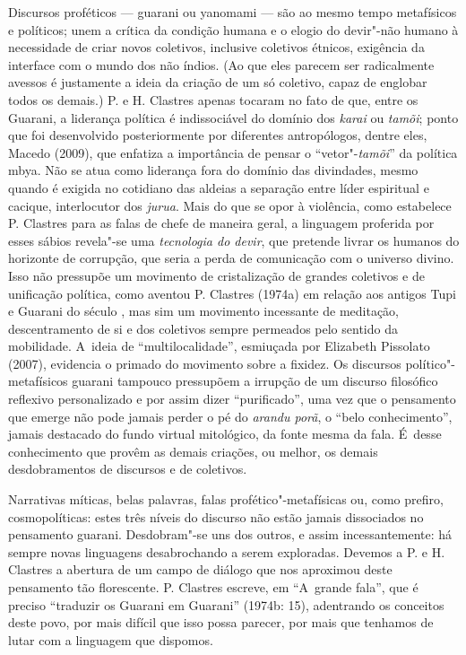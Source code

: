 Discursos proféticos --- guarani ou yanomami --- são ao mesmo tempo
metafísicos e políticos; unem a crítica da condição humana e o elogio
do devir"-não humano à necessidade de criar novos coletivos, inclusive
coletivos étnicos, exigência da interface com o mundo dos não índios.
(Ao que eles parecem ser radicalmente avessos é justamente a ideia da
criação de um só coletivo, capaz de englobar todos os demais.) P. e H.
Clastres apenas tocaram no fato de que, entre os Guarani, a liderança
política é indissociável do domínio dos \emph{karai} ou \emph{tamõi}; ponto que foi
desenvolvido posteriormente por diferentes antropólogos, dentre eles,
Macedo (2009), que enfatiza a importância de pensar o ``vetor"-\emph{tamõi}'' da
política mbya. Não se atua como liderança fora do domínio das
divindades, mesmo quando é exigida no cotidiano das aldeias a separação
entre líder espiritual e cacique, interlocutor dos \emph{jurua}. Mais do que
se opor à violência, como estabelece P. Clastres para as falas de chefe
de maneira geral, a linguagem proferida por esses sábios revela"-se uma
\emph{tecnologia do devir}, que pretende livrar os humanos do horizonte de
corrupção, que seria a perda de comunicação com o universo divino. Isso
não pressupõe um movimento de cristalização de grandes coletivos e de
unificação política, como aventou P. Clastres (1974a) em relação aos
antigos Tupi e Guarani do século , mas sim um movimento incessante
de meditação, descentramento de si e dos coletivos sempre permeados
pelo sentido da mobilidade. A~ideia de ``multilocalidade'', esmiuçada por
Elizabeth Pissolato (2007), evidencia o primado do movimento sobre a
fixidez. Os discursos político"-metafísicos guarani tampouco pressupõem
a irrupção de um discurso filosófico reflexivo personalizado e por
assim dizer ``purificado'', uma vez que o pensamento que emerge não pode
jamais perder o pé do \emph{arandu porã}, o ``belo conhecimento'', jamais
destacado do fundo virtual mitológico, da fonte mesma da fala. É~desse
conhecimento que provêm as demais criações, ou melhor, os demais
desdobramentos de discursos e de coletivos.

Narrativas míticas, belas palavras, falas profético"-metafísicas ou, como
prefiro, cosmopolíticas: estes três níveis do discurso não estão jamais
dissociados no pensamento guarani. Desdobram"-se uns dos outros, e assim
incessantemente: há sempre novas linguagens desabrochando a serem
exploradas. Devemos a P. e H. Clastres a abertura de um campo de
diálogo que nos aproximou deste pensamento tão florescente. P. Clastres
escreve, em ``A~grande fala'', que é preciso ``traduzir os Guarani em
Guarani'' (1974b: 15), adentrando os conceitos deste povo, por mais
difícil que isso possa parecer, por mais que tenhamos de lutar com a
linguagem que dispomos.

